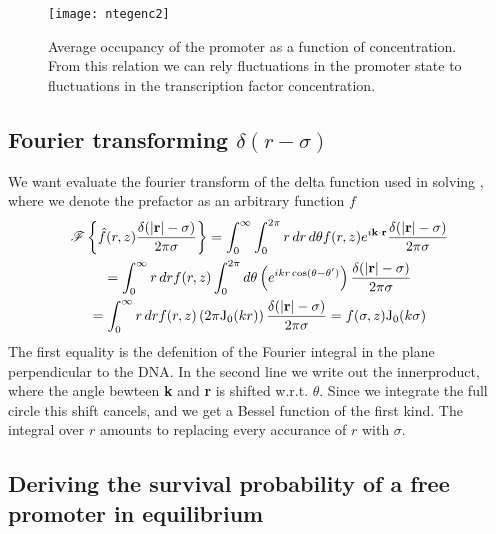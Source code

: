 \begin{figure}[ht]
\centering
\texttt{[image: ntegenc2]}
\caption{ Average occupancy of the promoter as a function of concentration. From this relation we can rely fluctuations in the promoter state to fluctuations in the transcription factor concentration.}
\end{figure}



\subsection{ Fourier transforming $\delta(r-\sigma)$}
We want evaluate the fourier transform of the delta function used in solving , where we denote the prefactor as an arbitrary function $f$
\begin{multline}
 \mathscr{F}\left\lbrace \hat{f}(r,z) \frac{\delta(|\mathbf r \mathrm| - \sigma)}{2 \pi \sigma} \right\rbrace 
 = \int_0^{\infty} \int_0^{2 \pi} r\,dr \, d\theta f(r,z) e^{i {\bf k \cdot r}} \frac{\delta(|\mathbf r \mathrm| - \sigma)}{2 \pi \sigma} \\
 = \int_0^{\infty} r\,dr f(r,z) \int_0^{2 \pi} d\theta \left( e^{i k r \, {\rm cos}(\theta - \theta')} \right) \frac{\delta(|\mathbf r \mathrm| - \sigma)}{2 \pi \sigma} \\
 = \int_0^{\infty} r\,dr f(r,z) \left( 2 \pi {\rm J_0}(k r) \right) \frac{\delta(|\mathbf r \mathrm| - \sigma)}{2 \pi \sigma} 
 = f(\sigma, z) {\rm J_0}(k \sigma)
\end{multline}
The first equality is the defenition of the Fourier integral in the plane perpendicular to the DNA. In the second line we write out the innerproduct, where the angle bewteen {\bf k} and {\bf r} is shifted w.r.t. $\theta$. Since we integrate the full circle this shift cancels, and we get a Bessel function of the first kind. The integral over $r$ amounts to replacing every accurance of $r$ with $\sigma$.




\newpage
\subsection{ Deriving the survival probability of a free promoter in equilibrium}

